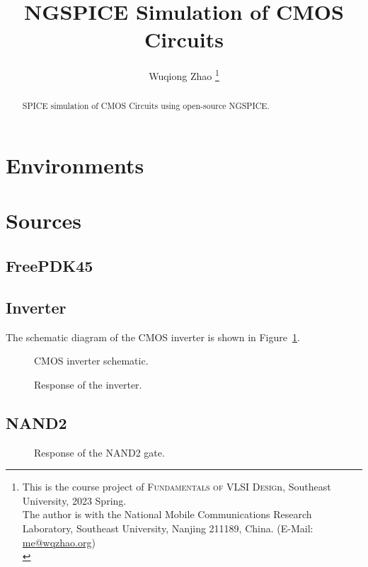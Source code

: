 \documentclass{scrartcl}
\title{NGSPICE Simulation of CMOS Circuits}
\author{Wuqiong Zhao%
  \thanks{\>
    This is the course project of \textsc{Fundamentals of VLSI Desig}n, Southeast University, 2023 Spring.\\
    The author is with the National Mobile Communications Research Laboratory,
    Southeast University, Nanjing 211189, China. (E-Mail: \href{mailto:me@wqzhao.org}{me@wqzhao.org})\\
  }}
\begin{document}
  \maketitle

  \begin{abstract}
    SPICE simulation of CMOS Circuits using open-source NGSPICE.
  \end{abstract}

  \tableofcontents


  \section{Environments}
  \section{Sources}

    \subsection{FreePDK45}

    \subsection{Inverter}

      The schematic diagram of the CMOS inverter is shown in Figure~\ref{fig:inv}.

      \begin{figure}[htbp]
        \centering
        
        \caption{CMOS inverter schematic.}
        \label{fig:inv}
      \end{figure}

      \begin{figure}[htbp]
        \sffamily
        \caption{Response of the inverter.}
      \end{figure}

    \subsection{NAND2}

      \begin{figure}[htbp]
        \sffamily
        \caption{Response of the NAND2 gate.}
      \end{figure}
\end{document}

